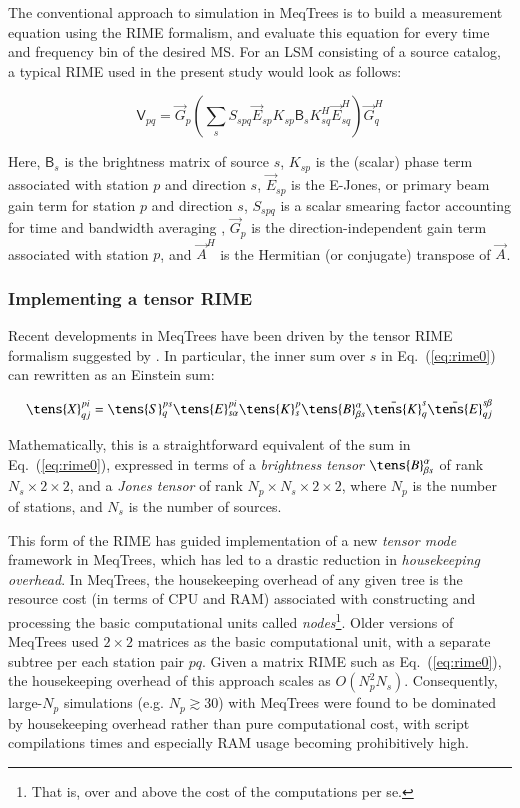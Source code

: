 \documentclass{aa}
\newcommand{\herm}{H}
\newcommand{\jones}[2]{\vec {#1}_{#2}}
\newcommand{\jonesT}[2]{\vec {#1}^{\herm}_{#2}}
\newcommand{\coh}[2]{\mathsf{{#1}}_{{#2}}}
\begin{document}
The conventional approach to simulation in MeqTrees is to build a measurement equation using the RIME formalism, and evaluate this equation for every time and frequency bin of the desired MS. For an LSM consisting of a source catalog, a typical RIME used in the present study would look as follows:

  \begin{equation}\label{eq:rime0}
  \coh{V}{pq} = \jones{G}{p} \left ( \sum_{s} S_{spq} {\jones{E}{sp} K_{sp} \coh{B}{s} K^\herm_{sq} \jonesT{E}{sq}} \right ) \jonesT{G}{q}
  \end{equation}

Here, $\coh{B}{s}$ is the brightness matrix of source $s$, $K_{sp}$ is the (scalar) phase term associated with station $p$  and direction $s$, $\jones{E}{sp}$ is the E-Jones, or primary beam gain term for station $p$ and direction $s$, $S_{spq}$ is a scalar smearing factor accounting for time and bandwidth averaging \citep[implemented as per Eq. (23) of ][]{RRIME1}, $\jones{G}{p}$ is the direction-independent gain term associated with station $p$, and $\jonesT{A}{}$ is the Hermitian (or conjugate) transpose of $\jones{A}{}$.

\subsubsection{Implementing a tensor RIME}

Recent developments in MeqTrees have been driven by the tensor RIME formalism suggested by \citet{RRIME4}. In particular, the inner sum over $s$ in Eq.~(\ref{eq:rime0}) can rewritten as an Einstein sum:

\begin{equation}
\label{eq:trime}
\tens{X}^{pi}_{qj} = 
  \tens{S}_{q}^{ps}\tens{E}_{s\alpha}^{pi}\tens{K}_{s}^{p}
  \tens{B}^\alpha_{\beta s}
  \bar\tens{K}_{q}^{s}
  \bar\tens{E}_{qj}^{s\beta}
\end{equation}

Mathematically, this is a straightforward equivalent of the sum in Eq.~(\ref{eq:rime0}), expressed in terms of a {\em brightness tensor} $\tens{B}^\alpha_{\beta s}$ of rank $N_s\times2\times2$, and a \emph{Jones tensor} of rank $N_p\times N_s\times2\times2$, where $N_p$ is the number of stations, and $N_s$ is the number of sources.

This form of the RIME has guided implementation of a new {\em tensor mode} framework in MeqTrees, which has led to a drastic reduction in {\em housekeeping overhead}. In MeqTrees, the housekeeping overhead of any given tree is the resource cost (in terms of CPU and RAM) associated with constructing and processing the basic computational units called {\em nodes}\footnote{That is, over and above the cost of the computations per se.}. Older versions of MeqTrees used $2\times2$ matrices as the basic computational unit, with a separate subtree per each station pair $pq$. Given a matrix RIME such as Eq.~(\ref{eq:rime0}), the housekeeping overhead of this approach scales as $O(N_p^2 N_s)$. Consequently, large-$N_p$ simulations (e.g. $N_p\gtrsim 30$) with MeqTrees were found to be dominated by housekeeping overhead rather than pure computational cost, with script compilations times and especially RAM usage becoming prohibitively high.
\end{document}
